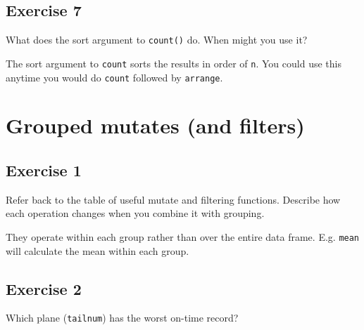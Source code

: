 \documentclass[]{book}
\newenvironment{Shaded}{\begin{snugshade}}{\end{snugshade}}
\newcommand{\CommentTok}[1]{\textcolor[rgb]{0.56,0.35,0.01}{\textit{#1}}}
\newcommand{\DataTypeTok}[1]{\textcolor[rgb]{0.13,0.29,0.53}{#1}}
\newcommand{\DecValTok}[1]{\textcolor[rgb]{0.00,0.00,0.81}{#1}}
\newcommand{\KeywordTok}[1]{\textcolor[rgb]{0.13,0.29,0.53}{\textbf{#1}}}
\newcommand{\NormalTok}[1]{#1}
\newcommand{\OperatorTok}[1]{\textcolor[rgb]{0.81,0.36,0.00}{\textbf{#1}}}
\newcommand{\OtherTok}[1]{\textcolor[rgb]{0.56,0.35,0.01}{#1}}
\newcommand{\StringTok}[1]{\textcolor[rgb]{0.31,0.60,0.02}{#1}}
\theoremstyle{definition}
\theoremstyle{definition}
\theoremstyle{definition}
\theoremstyle{remark}
\begin{document}
\hypertarget{exercise-7}{%
\subsection{Exercise 7}\label{exercise-7}}

What does the sort argument to \texttt{count()} do. When might you use
it?

The sort argument to \texttt{count} sorts the results in order of
\texttt{n}. You could use this anytime you would do \texttt{count}
followed by \texttt{arrange}.

\hypertarget{grouped-mutates-and-filters}{%
\section{Grouped mutates (and
filters)}\label{grouped-mutates-and-filters}}

\hypertarget{exercise-1-6}{%
\subsection{Exercise 1}\label{exercise-1-6}}

Refer back to the table of useful mutate and filtering functions.
Describe how each operation changes when you combine it with grouping.

They operate within each group rather than over the entire data frame.
E.g. \texttt{mean} will calculate the mean within each group.

\hypertarget{exercise-2-6}{%
\subsection{Exercise 2}\label{exercise-2-6}}

Which plane (\texttt{tailnum}) has the worst on-time record?

\begin{Shaded}
\end{Shaded}
\end{document}
